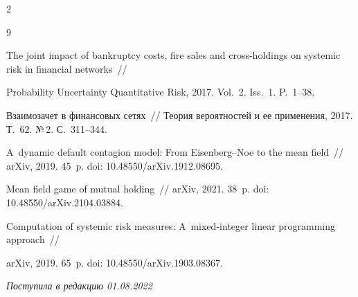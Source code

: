 \begin{multicols}{2}
{{\begin{thebibliography}{9}

 The joint impact of bankruptcy costs, fire sales and cross-holdings on systemic risk in financial networks~// 

Probability Uncertainty Quantitative Risk, 2017.  Vol.~2. Iss.~1. P.~1--38.






 Взаимозачет в финансовых сетях~// Теория вероятностей и ее применения, 2017. Т.~62. №\,2. С.~311--344.




 A~dynamic default contagion model: From Eisenberg--Noe to the mean field~// arXiv, 2019. 45~p. doi: 10.48550/arXiv.1912.08695.




 Mean field game of mutual holding~// arXiv, 2021. 38~p. doi: 10.48550/arXiv.2104.03884.














 Computation of systemic risk measures: A~mixed-integer linear programming approach~// 

arXiv, 2019. 65~p. doi: 10.48550/arXiv.1903.08367.





\end{thebibliography}

}}

\end{multicols}



 \label{end\stat}



 \vspace*{-6pt}



\hfill{\small\textit{Поступила в редакцию  01.08.2022}}


\renewcommand{\figurename}{\protect\bf Рис.}

\renewcommand{\tablename}{\protect\bf Таблица}

